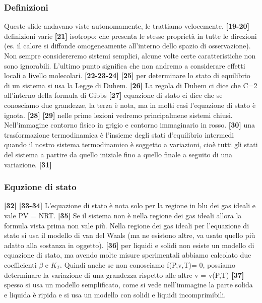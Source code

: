 \subsubsection*{Definizioni}
Queste slide andavano viste autonomamente, le trattiamo velocemente.\newline
\textbf{[19-20]}\; definizioni varie \newline
\textbf{[21]}\; isotropo: che presenta le stesse proprietà in tutte le direzioni (es. il calore si diffonde omogeneamente all'interno dello spazio di osservazione). Non sempre considereremo sistemi semplici, alcune volte certe caratteristiche non sono ignorabili. L'ultimo punto significa che non andremo a considerare effetti locali a livello molecolari.\newline
\textbf{[22-23-24]}\; \newline
\textbf{[25]}\; per determinare lo stato di equilibrio di un sistema si usa la Legge di Duhem.\newline
\textbf{[26]}\; La regola di Duhem ci dice che C=2 all'interno della formula di Gibbs \newline
\textbf{[27]}\; equazione di stato ci dice che se conosciamo due grandezze, la terza è nota, ma in molti casi l'equazione di stato è ignota.\newline
\textbf{[28]}\;\newline
\textbf{[29]}\; nelle prime lezioni vedremo principalmene sistemi chiusi. Nell'immagine contorno fisico in grigio e contorno immaginario in rosso.\newline
\textbf{[30]}\; una trasformazione termodinamica è l'insieme degli stati d'equilibrio intermedi quando il nostro sistema termodinamico è soggetto a variazioni, cioè tutti gli stati del sistema a partire da quello iniziale fino a quello finale a seguito di una variazione.\newline
\textbf{[31]}\;
\subsubsection*{Equzione di stato}
\textbf{[32]}\;\newline
\textbf{[33-34]}\; L'equazione di stato è nota solo per la regione in blu dei gas ideali e vale PV = NRT.\newline
\textbf{[35]}\; Se il sistema non è nella regione dei gas ideali allora la formula vista prima non vale più. Nella regione dei gas ideali per l'equazione di stato si usa il modello di van del Waals (ma ne esistono altre, va usato quello più adatto alla sostanza in oggetto).\newline
\textbf{[36]}\; per liquidi e solidi non esiste un modello di equazione di stato, ma avendo molte misure sperimentali abbiamo calcolato due coefficienti $\beta$ e $K_T$. Quindi anche se non conosciamo f(P,v,T)= 0, possiamo determinare la variazione di una grandezza rispetto alle altre v = v(P,T)\newline
\textbf{[37]}\; spesso si usa un modello semplificato, come si vede nell'immagine la parte solida e liquida è ripida e si usa un modello con solidi e liquidi incomprimibili.

